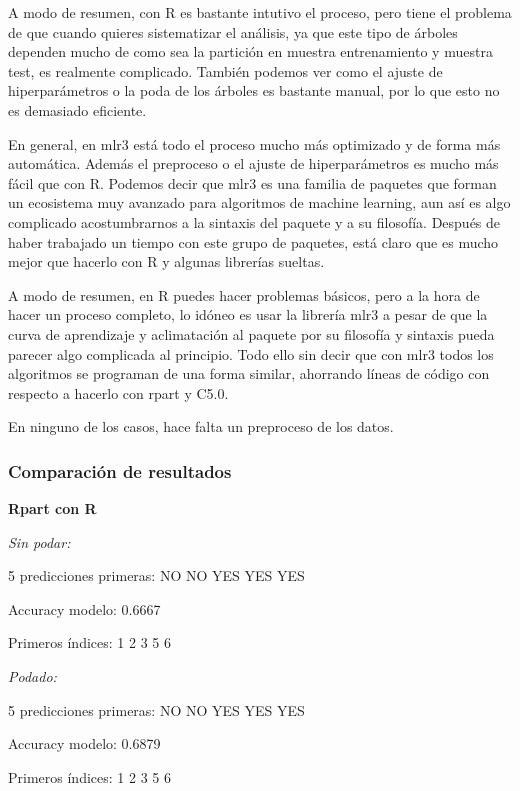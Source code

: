 \documentclass[
  11pt,
  a4paper,
]{article}
\begin{document}
A modo de resumen, con R es bastante intutivo el proceso, pero tiene el
problema de que cuando quieres sistematizar el análisis, ya que este
tipo de árboles dependen mucho de como sea la partición en muestra
entrenamiento y muestra test, es realmente complicado. También podemos
ver como el ajuste de hiperparámetros o la poda de los árboles es
bastante manual, por lo que esto no es demasiado eficiente.

En general, en mlr3 está todo el proceso mucho más optimizado y de forma
más automática. Además el preproceso o el ajuste de hiperparámetros es
mucho más fácil que con R. Podemos decir que mlr3 es una familia de
paquetes que forman un ecosistema muy avanzado para algoritmos de
machine learning, aun así es algo complicado acostumbrarnos a la
sintaxis del paquete y a su filosofía. Después de haber trabajado un
tiempo con este grupo de paquetes, está claro que es mucho mejor que
hacerlo con R y algunas librerías sueltas.

A modo de resumen, en R puedes hacer problemas básicos, pero a la hora
de hacer un proceso completo, lo idóneo es usar la librería mlr3 a pesar
de que la curva de aprendizaje y aclimatación al paquete por su
filosofía y sintaxis pueda parecer algo complicada al principio. Todo
ello sin decir que con mlr3 todos los algoritmos se programan de una
forma similar, ahorrando líneas de código con respecto a hacerlo con
rpart y C5.0.

En ninguno de los casos, hace falta un preproceso de los datos.

\newpage

\hypertarget{comparaciuxf3n-de-resultados}{%
\subsubsection{\texorpdfstring{Comparación de resultados
}{Comparación de resultados }}\label{comparaciuxf3n-de-resultados}}

\textbf{Rpart con R}

\emph{Sin podar:}

5 predicciones primeras: NO NO YES YES YES

Accuracy modelo: 0.6667

Primeros índices: 1 2 3 5 6

\emph{Podado:}

5 predicciones primeras: NO NO YES YES YES

Accuracy modelo: 0.6879

Primeros índices: 1 2 3 5 6
\end{document}
